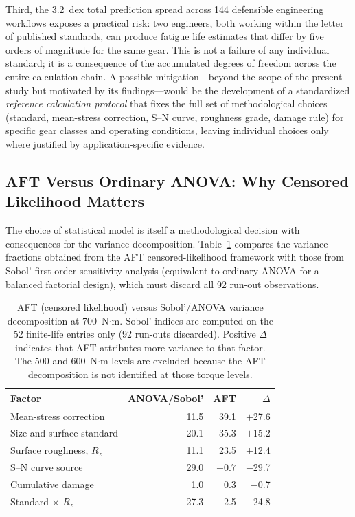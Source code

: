 \documentclass[12pt,a4paper]{article}
\begin{document}
Third, the 3.2~dex total prediction spread across 144 defensible
engineering workflows exposes a practical risk: two engineers, both
working within the letter of published standards, can produce fatigue
life estimates that differ by five orders of magnitude for the same
gear. This is not a failure of any individual standard; it is a
consequence of the accumulated degrees of freedom across the entire
calculation chain. A possible mitigation---beyond the scope of the
present study but motivated by its findings---would be the development
of a standardized \emph{reference calculation protocol} that fixes the
full set of methodological choices (standard, mean-stress correction,
S--N curve, roughness grade, damage rule) for specific gear classes and
operating conditions, leaving individual choices only where justified
by application-specific evidence.

\subsection{AFT Versus Ordinary ANOVA: Why Censored Likelihood Matters}
\label{sec:aft_vs_anova}

The choice of statistical model is itself a methodological decision
with consequences for the variance decomposition. Table~\ref{tab:aft_vs_anova}
compares the variance fractions obtained from the AFT censored-likelihood
framework with those from Sobol' first-order sensitivity analysis
(equivalent to ordinary ANOVA for a balanced factorial design), which
must discard all 92 run-out observations.

\begin{table}[h]
\centering
\caption{AFT (censored likelihood) versus Sobol'/ANOVA variance
decomposition at 700~N$\cdot$m. Sobol' indices are computed on the
52 finite-life entries only (92 run-outs discarded). Positive
$\Delta$ indicates that AFT attributes more variance to that factor.
The 500 and 600~N$\cdot$m levels are excluded because the AFT
decomposition is not identified at those torque levels.\label{tab:aft_vs_anova}}
\begin{tabular}{lrrr}
\toprule
Factor & ANOVA/Sobol' & AFT & $\Delta$ \\
\midrule
Mean-stress correction & 11.5 & 39.1 & $+$27.6 \\
Size-and-surface standard & 20.1 & 35.3 & $+$15.2 \\
Surface roughness, $R_z$ & 11.1 & 23.5 & $+$12.4 \\
S--N curve source & 29.0 & $-0.7$ & $-$29.7 \\
Cumulative damage & 1.0 & 0.3 & $-$0.7 \\
Standard $\times$ $R_z$ & 27.3 & 2.5 & $-$24.8 \\
\bottomrule
\end{tabular}
\end{table}
\end{document}
